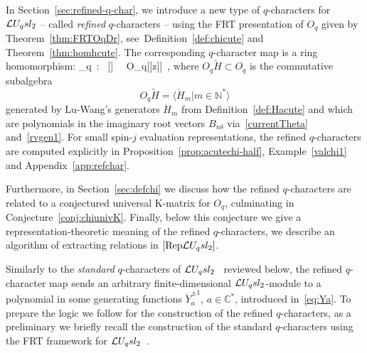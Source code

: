 \documentclass[11pt]{amsart}
\numberwithin{equation}{section}
\numberwithin{equation}{section}
\begin{document}
In Section~\ref{sec:refined-q-char}, we introduce a new type of $q$-characters for $\mathcal{L} U_q sl_2$ -- called \textit{refined} $q$-characters -- using the FRT presentation of $O_q$  given by Theorem~\ref{thm:FRTOqDr}, see~Definition~\ref{def:chicute} and Theorem~\ref{thm:homhcute}.
The corresponding $q$-character map is a ring homomorphism:
 \beqa
\acute{\chi}_q\ : \ [\Loop] \ \rightarrow \ O_q[[z]]\ ,\label{eq:typechi0}
\eeqa
where  $O_q\widetilde{H}\subset O_q$ is the commutative subalgebra
 \begin{equation}\label{eq:OqHt}
         O_q\tilde{H}= \langle \acute{H}_m|m\in{\mathbb N}^*\rangle 
         \end{equation}
generated by  Lu-Wang's generators $\acute{H}_m$ \cite{LW20} from Definition~\ref{def:Hacute} and which are polynomials in the imaginary root vectors $B_{n\delta}$ via~\eqref{currentTheta} and~\eqref{rvgen1}. 
For small spin-$j$ evaluation representations, the refined $q$-characters are computed explicitly in Proposition~\ref{prop:acutechi-half}, Example~\ref{valchi1} and Appendix~\ref{app:refchar}. 

Furthermore, in Section~\ref{sec:defchi} we discuss how  the refined $q$-characters are related to a conjectured universal K-matrix for $O_q$, culminating in Conjecture~\ref{conj:chiunivK}. Finally, below this conjecture we give a representation-theoretic meaning of the refined $q$-characters, we describe an algorithm of extracting relations in $[\mathrm{Rep}\mathcal{L} U_q sl_2]$. 

\medskip

Similarly to the {\it standard} $q$-characters of $\mathcal{L} U_q sl_2$~\cite{FR99}  reviewed below, the refined $q$-character map sends an arbitrary finite-dimensional $\mathcal{L} U_q sl_2$-module  to a polynomial in some generating functions $\acute{Y}_a^{\pm 1}$, $a\in{\mathbb C}^*$, introduced in~\eqref{eq:Ya}. 
To prepare the logic we follow for the construction of the refined $q$-characters, as a preliminary we briefly recall the construction of the standard $q$-characters using the FRT framework for $\mathcal{L} U_q sl_2$~\cite{FR99}.
\end{document}
